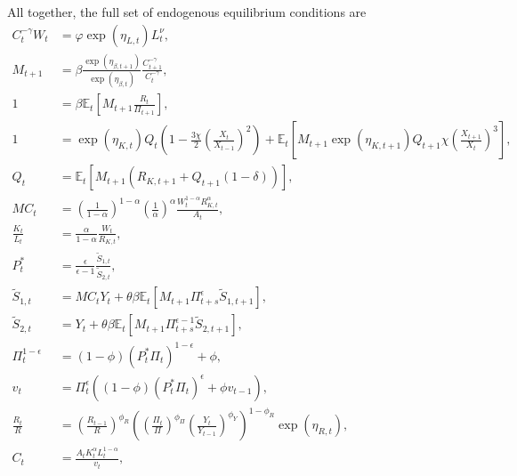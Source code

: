 \documentclass[12 pt, oneside]{article}
\theoremstyle{definition}
\theoremstyle{definition}
\theoremstyle{definition}
\newcommand{\E}{\mathbb{E}}
\begin{document}
All together, the full set of endogenous equilibrium conditions are
\begin{align}
  \label{eq:consumption labor eqm}
    C_t^{-\gamma} W_t & = \varphi\exp(\eta_{L, t}) L_t^\nu,\\
  \label{eq:stochastic discount factor}
  M_{t + 1} & = \beta\frac{\exp(\eta_{\beta, t + 1})}{\exp(\eta_{\beta, t})}\frac{C_{t + 1}^{-\gamma}}{C_t^{-\gamma}},\\
  \label{eq:euler eqn eqm}
  1 & = \beta \E_t\left[M_{t + 1}\frac{R_t}{\Pi_{t + 1}}\right],\\
  \label{eq:tobins q eqm}
    1  & =  \exp(\eta_{K, t}) Q_t \left(1 - \frac{3\chi}{2}\left(\frac{X_t}{X_{t - 1}}\right)^2\right)  + \E_t\left[M_{t + 1}\exp(\eta_{K, t + 1})Q_{t + 1} \chi \left(\frac{X_{t + 1}}{X_t}\right)^3\right],\\
  \label{eq:capital asset pricing eqm}
  Q_t & = \E_t[M_{t + 1} (R_{K, t + 1} + Q_{t + 1}(1  - \delta))],\\
  \label{eq:mc soln eqm}
  MC_t & =  \left(\frac{1}{1 - \alpha}\right)^{1 - \alpha}\left(\frac{1}{\alpha}\right)^{\alpha}\frac{W_t^{1 - \alpha}R_{K, t}^{\alpha}}{ A_t},\\
  \label{eq:optimal capital labor ratio eqm}
  \frac{K_t}{L_t} & =\frac{\alpha}{1 - \alpha} \frac{W_t}{R_{K, t}},\\
  \label{eq:real optimal reset price eqm}
  P_t^* & = \frac{\epsilon}{\epsilon - 1}\frac{\tilde{S}_{1, t}}{\tilde{S}_{2, t}},\\
  \label{eq:numerator recursion eqm}
  \tilde{S}_{1, t} & = MC_t Y_t + \theta\beta\E_t[M_{t + 1} \Pi_{t + s}^\epsilon \tilde{S}_{1, t + 1}],\\
  \label{eq:denominator recursion eqm}
  \tilde{S}_{2, t} & =  Y_t + \theta\beta\E_t[M_{t + 1} \Pi_{t + s}^{\epsilon - 1} \tilde{S}_{2, t + 1}],\\
  \label{eq:inflation from optimal reset price eqm}
  \Pi_t^{ 1 - \epsilon} & = (1 - \phi) (P_t^*\Pi_t)^{1 - \epsilon} + \phi,\\
  \label{eq:price dispersion evol eqm}
  v_t & = \Pi_t^{\epsilon}((1 - \phi) (P_t^* \Pi_t)^{\epsilon} + \phi v_{t - 1}),\\
  \label{eq:taylor rule eqm}
  \frac{R_t}{R} & =  \left(\frac{R_{t - 1}}{R}\right)^{\phi_R}\left(\left(\frac{\Pi_t}{\Pi}\right)^{\phi_\Pi}\left(\frac{Y_t}{Y_{t - 1}}\right)^{\phi_Y}\right)^{1 - \phi_R}\exp(\eta_{R, t}),\\
  \label{eq:consumption market clearing eqm}
  C_t & = \frac{A_t K_t^{\alpha}L_t^{1 - \alpha}}{v_t},
\end{align}
\end{document}
